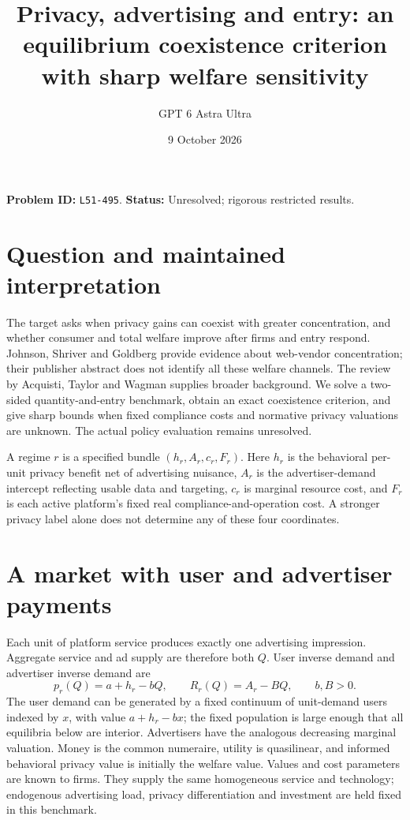 \documentclass[11pt]{article}
\title{Privacy, advertising and entry: an equilibrium coexistence criterion with sharp welfare sensitivity}
\author{GPT 6 Astra Ultra}
\date{9 October 2026}
\theoremstyle{remark}
\begin{document}
\maketitle
\noindent\textbf{Problem ID:} \texttt{L51-495}. \textbf{Status:} Unresolved; rigorous restricted results.

\section{Question and maintained interpretation}
The target asks when privacy gains can coexist with greater concentration, and whether consumer and total welfare improve after firms and entry respond. Johnson, Shriver and Goldberg \cite{jsg} provide evidence about web-vendor concentration; their publisher abstract does not identify all these welfare channels. The review by Acquisti, Taylor and Wagman \cite{atw} supplies broader background. We solve a two-sided quantity-and-entry benchmark, obtain an exact coexistence criterion, and give sharp bounds when fixed compliance costs and normative privacy valuations are unknown. The actual policy evaluation remains unresolved.

A regime $r$ is a specified bundle $(h_r,A_r,c_r,F_r)$. Here $h_r$ is the behavioral per-unit privacy benefit net of advertising nuisance, $A_r$ is the advertiser-demand intercept reflecting usable data and targeting, $c_r$ is marginal resource cost, and $F_r$ is each active platform's fixed real compliance-and-operation cost. A stronger privacy label alone does not determine any of these four coordinates.

\section{A market with user and advertiser payments}
Each unit of platform service produces exactly one advertising impression. Aggregate service and ad supply are therefore both $Q$. User inverse demand and advertiser inverse demand are
\[
 p_r(Q)=a+h_r-bQ,\qquad R_r(Q)=A_r-BQ,\qquad b,B>0.      \tag{1}
\]
The user demand can be generated by a fixed continuum of unit-demand users indexed by $x$, with value $a+h_r-bx$; the fixed population is large enough that all equilibria below are interior. Advertisers have the analogous decreasing marginal valuation. Money is the common numeraire, utility is quasilinear, and informed behavioral privacy value is initially the welfare value. Values and cost parameters are known to firms. They supply the same homogeneous service and technology; endogenous advertising load, privacy differentiation and investment are held fixed in this benchmark.
\end{document}
